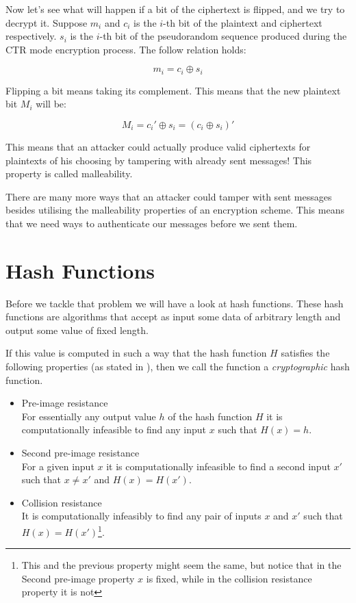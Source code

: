 Now let's see what will happen if a bit of the ciphertext is flipped, and we try to decrypt it.
Suppose $m_i$ and $c_i$ is the $i$-th bit of the plaintext and ciphertext respectively. $s_i$ is the $i$-th bit of the pseudorandom sequence produced during the CTR mode encryption process.
The follow relation holds:

\[
  m_i = c_i \oplus s_i
\]

Flipping a bit means taking its complement.
This means that the new plaintext bit $M_i$ will be:

\[
  M_i = c_i\prime \oplus s_i = (c_i \oplus s_i)\prime
\]

This means that an attacker could actually produce valid ciphertexts for plaintexts of his choosing by tampering with already sent messages!
This property is called malleability.

There are many more ways that an attacker could tamper with sent messages besides utilising the malleability properties of an encryption scheme.
This means that we need ways to authenticate our messages before we sent them.

\section{Hash Functions}

Before we tackle that problem we will have a look at hash functions.
These hash functions are algorithms that accept as input some data of arbitrary length and output some value of fixed length.

If this value is computed in such a way that the hash function $H$ satisfies the following properties (as stated in \cite{appliedcrypto}), then we call the function a \emph{cryptographic} hash function.

\begin{itemize}
  \item Pre-image resistance\\[0.2cm]
    For essentially any output value $h$ of the hash function $H$ it is computationally infeasible to find any input $x$ such that $H(x) = h$.

  \item Second pre-image resistance\\[0.2cm]
    For a given input $x$ it is computationally infeasible to find a second input $x\prime$ such that $x \ne x\prime$ and $H(x) = H(x\prime)$.

  \item Collision resistance\\[0.2cm]
    It is computationally infeasibly to find any pair of inputs $x$ and $x\prime$ such that $H(x) = H(x\prime)$\footnote{This and the previous property might seem the same, but notice that in the Second pre-image property $x$ is fixed, while in the collision resistance property it is not}.
\end{itemize}

